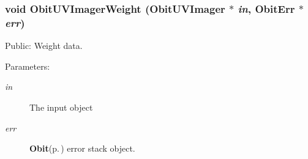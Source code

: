 \subsubsection{\setlength{\rightskip}{0pt plus 5cm}void Obit\-UVImager\-Weight ({\bf Obit\-UVImager} $\ast$ {\em in}, {\bf Obit\-Err} $\ast$ {\em err})}\label{ObitUVImager_8h_a19}


Public: Weight data. 

\begin{Desc}
\item[Parameters:]
\begin{description}
\item[{\em in}]The input object \item[{\em err}]{\bf Obit}{\rm (p.\,\pageref{structObit})} error stack object. \end{description}
\end{Desc}
